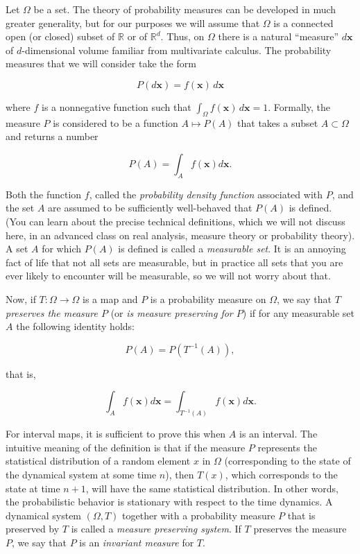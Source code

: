 \documentclass[11pt]{report}
\theoremstyle{plain}
\theoremstyle{definition}
\begin{document}
Let $\Omega$ be a set. The theory of probability
measures can be developed in much greater generality,
but for our purposes we will assume that $\Omega$ is
a connected open (or closed) subset of $\mathbb{R}$
or of $\mathbb{R}^d$. Thus, on $\Omega$ there is a
natural ``measure'' $d\mathbf{x}$ of $d$-dimensional
volume familiar from multivariate calculus. The
probability measures that we will consider take the
form

\[
P(d\mathbf{x})=f(\mathbf{x})\,d\mathbf{x}
\]

where $f$ is a nonnegative function such that
$\int_{\Omega} f(\mathbf{x})\,d\mathbf{x} = 1$.
Formally, the measure $P$ is considered to be a
function $A\mapsto P(A)$ that takes a subset
$A\subset \Omega$ and returns a number

\[
P(A) = \int_A f(\mathbf{x})d\mathbf{x}.
\]

Both the function $f$, called the \emph{probability
density function} associated with $P$, and the set $A$
are assumed to be sufficiently well-behaved that
$P(A)$ is defined. (You can learn about the precise
technical definitions, which we will not discuss here,
in an advanced class on real analysis, measure theory
or probability theory). A set $A$ for which $P(A)$ is
defined is called a \emph{measurable set}. It is an
annoying fact of life that not all sets are
measurable, but in practice all sets that you are ever
likely to encounter will be measurable, so we will not
worry about that.

Now, if $T:\Omega\to \Omega$ is a map and $P$ is a
probability measure on $\Omega$, we say that $T$
\emph{preserves the measure $P$} (or \emph{is measure
preserving for $P$}) if for any measurable set $A$
the following identity holds:

\[
P(A) = P(T^{-1}(A)),
\]

that is,

\[
\int_A f(\mathbf{x})d\mathbf{x} = \int_{T^{-1}(A)} f(\mathbf{x})d\mathbf{x}.
\]

For interval maps, it is sufficient to prove this
when $A$ is an interval. The intuitive meaning of the
definition is that if the measure $P$ represents the
statistical distribution of a random element $x$ in
$\Omega$ (corresponding to the state of the dynamical
system at some time $n$), then $T(x)$, which
corresponds to the state at time $n+1$, will have the
same statistical distribution. In other words, the
probabilistic behavior is stationary with respect to
the time dynamics. A dynamical system $(\Omega, T)$
together with a probability measure $P$ that is
preserved by $T$ is called a \emph{measure preserving
system}. If $T$ preserves the measure $P$, we say
that $P$ is an \emph{invariant measure} for $T$.
\end{document}
